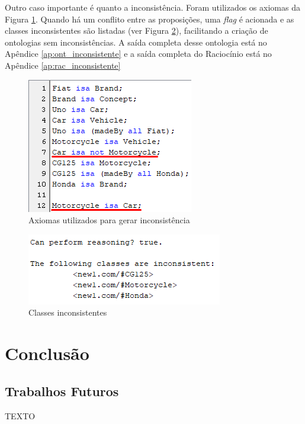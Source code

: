 \documentclass{bcc}
\begin{document}
Outro caso importante é quanto a inconsistência. Foram utilizados os axiomas da Figura \ref{fig:axioma_inconsistencia}. Quando há um conflito entre as proposições, uma \textit{flag} é acionada e as classes inconsistentes são listadas (ver Figura \ref{fig:axioma_inconsistencia_rac}), facilitando a criação de ontologias sem inconsistências. A saída completa desse ontologia está no Apêndice \ref{ap:ont_inconsistente} e a saída completa do Raciocínio está no Apêndice \ref{ap:rac_inconsistente}


\begin{figure}[H]
\centering
\includegraphics[width=.5\textwidth]{Figuras/axiomas_inconsistencia.png}
\caption{Axiomas utilizados para gerar inconsistência} 
\label{fig:axioma_inconsistencia}
\end{figure}

\begin{figure}[H]
\centering
\includegraphics[width=.6\textwidth]{Figuras/axiomas_inconsistencia_rac.png}
\caption{Classes inconsistentes} 
\label{fig:axioma_inconsistencia_rac}
\end{figure}

\chapter{Conclusão}
\label{chap:conclusao}

\section{Trabalhos Futuros}

TEXTO



\end{document}
